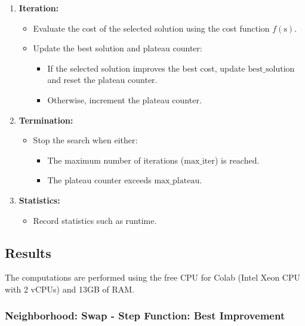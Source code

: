 \documentclass{article}
\begin{document}
\begin{enumerate}
    \item \textbf{Iteration:}
    \begin{itemize}
        \item Evaluate the cost of the selected solution using the cost function \( f(\text{s}) \).
        \item Update the best solution and plateau counter:
        \begin{itemize}
            \item If the selected solution improves the best cost, update \( \text{best\_solution} \) and reset the plateau counter.
            \item Otherwise, increment the plateau counter.
        \end{itemize}
    \end{itemize}
    
    \item \textbf{Termination:}
    \begin{itemize}
        \item Stop the search when either:
        \begin{itemize}
            \item The maximum number of iterations (\( \text{max\_iter} \)) is reached.
            \item The plateau counter exceeds \( \text{max\_plateau} \).
        \end{itemize}
    \end{itemize}
    
    \item \textbf{Statistics:}
    \begin{itemize}
        \item Record statistics such as runtime.
    \end{itemize}
\end{enumerate}

\subsection*{Results}
The computations are performed using the free CPU for Colab (Intel Xeon CPU with 2 vCPUs) and 13GB of RAM.

\subsubsection*{Neighborhood: Swap - Step Function: Best Improvement}
\end{document}
